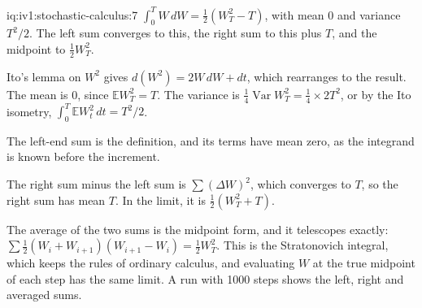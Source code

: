 \begin{solution}{iq:iv1:stochastic-calculus:7}
$\int_0^TW\,dW = \frac12(W_T^2 - T)$, with mean 0 and variance $T^2/2$. The left sum converges to this, the right sum to this plus $T$, and the midpoint to $\frac12W_T^2$.

Ito's lemma on $W^2$ gives $d(W^2) = 2W\,dW + dt$, which rearranges to the result. The mean is 0, since $\mathbb{E}W_T^2 = T$. The variance is $\frac14\operatorname{Var}W_T^2 = \frac14 \times 2T^2$, or by the Ito isometry, $\int_0^T\mathbb{E}W_t^2\,dt = T^2/2$.

The left-end sum is the definition, and its terms have mean zero, as the integrand is known before the increment.

The right sum minus the left sum is $\sum(\Delta W)^2$, which converges to $T$, so the right sum has mean $T$. In the limit, it is $\frac12(W_T^2 + T)$.

The average of the two sums is the midpoint form, and it telescopes exactly: $\sum\frac12(W_i + W_{i + 1})(W_{i + 1} - W_i) = \frac12W_T^2$. This is the Stratonovich integral, which keeps the rules of ordinary calculus, and evaluating $W$ at the true midpoint of each step has the same limit. A run with 1000 steps shows the left, right and averaged sums.



\end{solution}

